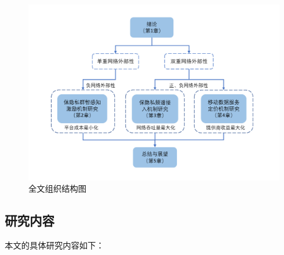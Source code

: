 
\begin{figure}[t]
\centering
\includegraphics[width=1.05\textwidth]{pic/jiegou2.pdf}
\caption{全文组织结构图}
\label{fig:the}
\end{figure}

\subsection{研究内容}

本文的具体研究内容如下：


